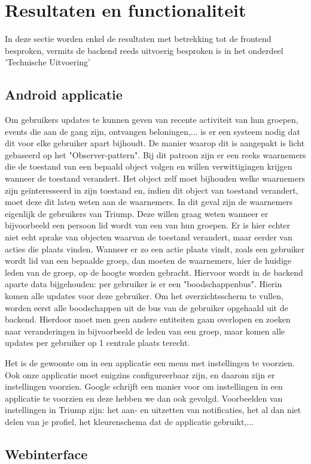 
\chapter{Resultaten en functionaliteit}
In deze sectie worden enkel de resultaten met betrekking tot de frontend besproken, vermits de backend reeds uitvoerig besproken is in het onderdeel 'Technische Uitvoering'
\section{Android applicatie}

Om gebruikers updates te kunnen geven van recente activiteit van hun groepen, events die aan de gang zijn, ontvangen beloningen,... is er een systeem nodig dat dit voor elke gebruiker apart bijhoudt.
De manier waarop dit is aangepakt is licht gebaseerd op het "Observer-pattern". Bij dit patroon zijn er een reeks waarnemers die de toestand van een bepaald object volgen 
en willen verwittigingen krijgen wanneer de toestand verandert. 
Het object zelf moet bijhouden welke waarnemers zijn geïnteresseerd in zijn toestand en, indien dit object van toestand verandert, moet deze dit laten weten aan de waarnemers.
In dit geval zijn de waarnemers eigenlijk de gebruikers van Triump. Deze willen graag weten wanneer er bijvoorbeeld een persoon lid wordt van een van hun groepen.
Er is hier echter niet echt sprake van objecten waarvan de toestand verandert, maar eerder van acties die plaats vinden. Wanneer er zo een actie plaats vindt, zoals een gebruiker wordt lid van een bepaalde groep,
dan moeten de waarnemers, hier de huidige leden van de groep, op de hoogte worden gebracht.
Hiervoor wordt in de backend aparte data bijgehouden: per gebruiker is er een "boodschappenbus". Hierin komen alle updates voor deze gebruiker. Om het overzichtsscherm te vullen, worden eerst alle boodschappen uit de bus van de gebruiker opgehaald uit de backend. Hierdoor moet men geen andere entiteiten gaan overlopen en zoeken naar veranderingen in bijvoorbeeld de leden van een groep, maar komen alle updates per gebruiker op 1 centrale plaats terecht.

Het is de gewoonte om in een applicatie een menu met instellingen te voorzien. Ook onze applicatie moet enigzins configureerbaar zijn, en daarom zijn er instellingen voorzien.
Google schrijft een manier voor om instellingen in een applicatie te voorzien %
en deze hebben we dan ook gevolgd. Voorbeelden van instellingen in Triump zijn: het aan- en uitzetten van notificaties, het al dan niet delen van je profiel, het kleurenschema dat de applicatie gebruikt,...


\section{Webinterface}
